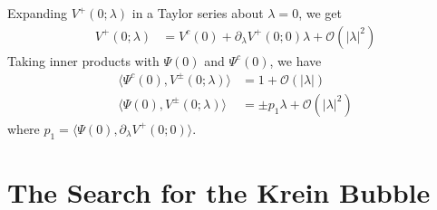 \documentclass[thesis.tex]{subfiles}
\begin{document}
\begin{enumerate}
	Expanding $V^+(0; \lambda)$ in a Taylor series about $\lambda = 0$, we get
	\begin{align*}
	V^+(0; \lambda) 
	&= V^c(0) + \partial_\lambda V^+(0; 0) \lambda + \mathcal{O}(|\lambda|^2) 
	\end{align*}
	Taking inner products with $\Psi(0)$ and $\Psi^c(0)$, we have
	\begin{equation}
	\begin{aligned}
	\langle \Psi^c(0), V^\pm(0; \lambda) \rangle &= 1 + \mathcal{O}(|\lambda|) \\
	\langle \Psi(0), V^\pm(0; \lambda) \rangle &= \pm p_1 \lambda + \mathcal{O}(|\lambda|^2)
	\end{aligned}
	\end{equation}
	where $p_1 = \langle \Psi(0), \partial_\lambda V^+(0; 0) \rangle$.

\end{enumerate}

\section{The Search for the Krein Bubble}
\end{document}
